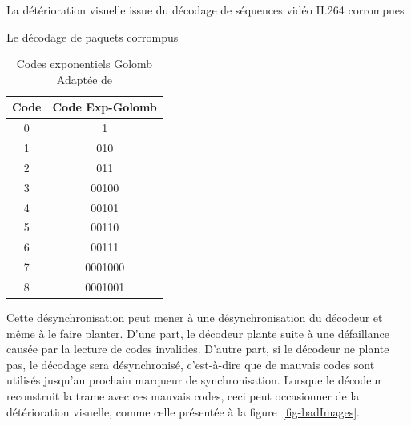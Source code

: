 \documentclass[letterpaper, twoside, 12pt,memoire]{thETS}
\newcommand{\fig}[1]{figure~\ref{#1}}
\begin{document}
\begin{chapter}{La détérioration visuelle issue du décodage de séquences vidéo
H.264 corrompues}
\begin{section}{Le décodage de paquets corrompus}
\begin{table}[!htb]
\caption{Codes exponentiels Golomb \\Adaptée de
\citet[p.~11]{Ikuno2007}}
\vspace{-1em}
\label{tab-ExpGolomb}
\centering
  \begin{tabular}{| c | c | }
    \hline
    Code & Code Exp-Golomb\\
    \hline
    0 & 1\\ \hline
    1 & 010\\ \hline
    2 & 011\\ \hline
    3 & 00100\\ \hline
    4 & 00101\\ \hline
    5 & 00110\\ \hline
    6 & 00111\\ \hline
    7 & 0001000\\ \hline
    8 & 0001001\\ \hline
  \end{tabular}
\end{table}

Cette désynchronisation peut mener à une désynchronisation du décodeur et même à  le faire planter. D'une part, le décodeur plante suite à une défaillance causée
par la lecture de codes invalides. D'autre part, si le décodeur ne plante pas, le décodage sera
désynchronisé, c'est-à-dire que de mauvais codes sont utilisés jusqu'au prochain
marqueur de synchronisation. Lorsque le décodeur reconstruit la trame avec ces
mauvais codes, ceci peut occasionner de la détérioration visuelle, comme celle
présentée à la \fig{fig-badImages}.


\end{section}
\end{chapter}
\end{document}
